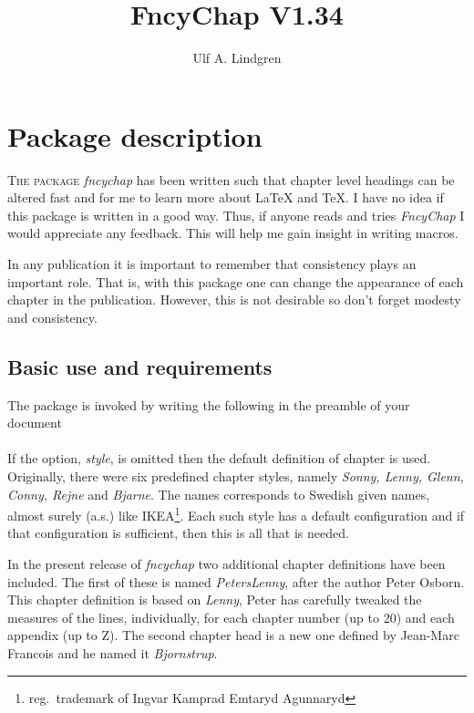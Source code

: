\documentclass{report}
\title{FncyChap V1.34}
\author{Ulf A. Lindgren}
\date{}
\newcommand{\sk}{\vspace{0.2 cm}}
\newcommand{\A}[1]{{$\backslash$\texttt{#1}}}
\newcommand{\nsp}{\mbox{\hspace{-1 cm}}}
\begin{document}
  \maketitle
  \tableofcontents
  \chapter{Package description}
    \lettrine{T}{he package} \textsl{fncychap} has been written such that
    chapter level headings can be altered fast and for me to learn more
    about \LaTeX{} and \TeX{}. I have no idea if this package is
    written in a good way. Thus, if anyone reads and tries {\em
    FncyChap} I would appreciate any feedback. This will help me gain
  insight in writing macros. 
    
    In any publication it is important to remember that consistency
    plays an important role. That is, with this package one can change
    the appearance of each chapter in the publication. However, this is
    not desirable so don't forget modesty and consistency.

    \section{Basic use and requirements}
    The package is invoked by writing the following in the preamble of
    your document\sk\\
    \nsp\fbox{\A{usepackage}[{\em style}]\{{\em fncychap}\}}\sk\\
    If the option, {\em style}, is omitted then the default definition
    of chapter is used. Originally, there were six predefined chapter styles,
    namely {\em Sonny, Lenny, Glenn, Conny, Rejne} and {\em Bjarne}.
    The names corresponds to Swedish given names, almost surely (a.s.)
    like
    IKEA\footnote{reg.~trademark of Ingvar Kamprad Emtaryd
    Agunnaryd}. Each such style has a default configuration and if
    that configuration is sufficient, then this is all that is needed.
    
    In the present release of \textsl{fncychap} two additional chapter
    definitions have been included. The first of these is named {\em
      PetersLenny}, after the author Peter Osborn. This chapter
    definition is based on {\em Lenny}, Peter has carefully tweaked
    the measures of the lines, individually, for each chapter number (up to 20)
    and each appendix (up to Z). The second chapter head is a new one
    defined by Jean-Marc Francois and he named it \textsl{Bjornstrup}.
\end{document}
